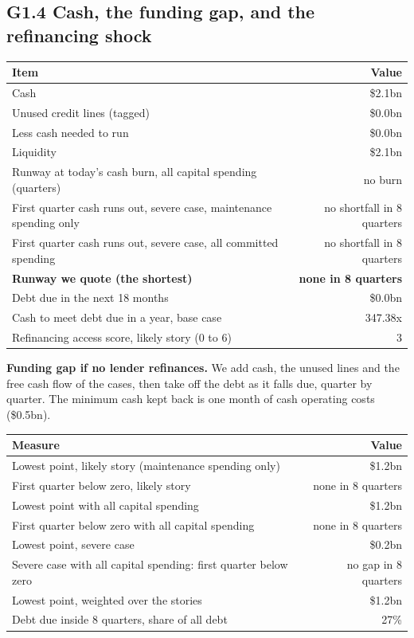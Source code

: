\documentclass[11pt,a4paper]{article}
\begin{document}
\subsection*{G1.4 Cash, the funding gap, and the refinancing shock}
\begin{center}\footnotesize\setlength{\tabcolsep}{3.5pt}\begin{tabular}{@{}lr@{}}\toprule
Item & Value \\\midrule
Cash & \$2.1bn \\
Unused credit lines (tagged) & \$0.0bn \\
Less cash needed to run & \$0.0bn \\
Liquidity & \$2.1bn \\
Runway at today's cash burn, all capital spending (quarters) & no burn \\
First quarter cash runs out, severe case, maintenance spending only & no shortfall in 8 quarters \\
First quarter cash runs out, severe case, all committed spending & no shortfall in 8 quarters \\
\textbf{Runway we quote (the shortest)} & \textbf{none in 8 quarters} \\
Debt due in the next 18 months & \$0.0bn \\
Cash to meet debt due in a year, base case & 347.38x \\
Refinancing access score, likely story (0 to 6) & 3 \\
\bottomrule\end{tabular}\end{center}
\textbf{Funding gap if no lender refinances.} We add cash, the unused lines and the free cash flow of the cases, then take off the debt as it falls due, quarter by quarter. The minimum cash kept back is one month of cash operating costs (\$0.5bn).
\begin{center}\footnotesize\setlength{\tabcolsep}{3.5pt}\begin{tabular}{@{}lr@{}}\toprule
Measure & Value \\\midrule
Lowest point, likely story (maintenance spending only) & \$1.2bn \\
First quarter below zero, likely story & none in 8 quarters \\
Lowest point with all capital spending & \$1.2bn \\
First quarter below zero with all capital spending & none in 8 quarters \\
Lowest point, severe case & \$0.2bn \\
Severe case with all capital spending: first quarter below zero & no gap in 8 quarters \\
Lowest point, weighted over the stories & \$1.2bn \\
Debt due inside 8 quarters, share of all debt & 27\% \\
\bottomrule\end{tabular}\end{center}
\end{document}
